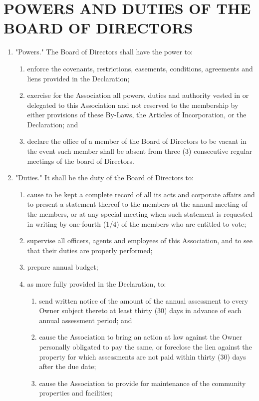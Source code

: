 \documentclass[12pt, letterpaper]{article}
\begin{document}
\section{POWERS AND DUTIES OF THE BOARD OF DIRECTORS}
\begin{enumerate}
 \item "Powers."
  The Board of Directors shall have the power to:
  \begin{enumerate}
   \item enforce the covenants, restrictions, easements, conditions, agreements and liens provided in the Declaration;
   \item exercise for the Association all powers, duties and authority vested in or delegated to this Association and not reserved to the membership by either provisions of these By-Laws, the Articles of Incorporation, or the Declaration; and
   \item declare the office of a member of the Board of Directors to be vacant in the event such member shall be absent from three (3) consecutive regular meetings of the board of Directors.
  \end{enumerate}
 \item "Duties."
  It shall be the duty of the Board of Directors to:
  \begin{enumerate}
   \item cause to be kept a complete record of all its acts and corporate affairs and to present a statement thereof to the members at the annual meeting of the members, or at any special meeting when such statement is requested in writing by one-fourth (1/4) of the members who are entitled to vote;
   \item supervise all officers, agents and employees of this Association, and to see that their duties are properly performed;
   \item prepare annual budget;
   \item as more fully provided in the Declaration, to:
   \begin{enumerate}
    \item send written notice of the amount of the annual assessment to every Owner subject thereto at least thirty (30) days in advance of each annual assessment period; and
    \item cause the Association to bring an action at law against the Owner personally obligated to pay the same, or foreclose the lien against the property for which assessments are not paid within thirty (30) days after the due date;
    \item cause the Association to provide for maintenance of the community properties and facilities;

\end{enumerate}
\end{enumerate}
\end{enumerate}
\end{document}
